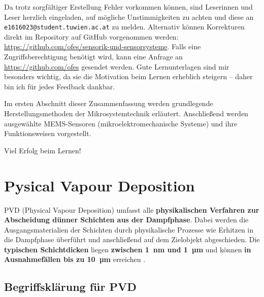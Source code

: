\documentclass{article} %
\begin{document}
Da trotz sorgfältiger Erstellung Fehler vorkommen können, sind Leserinnen und Leser herzlich eingeladen, auf mögliche Unstimmigkeiten zu achten und diese an \texttt{e1616023@student.tuwien.ac.at} zu melden. Alternativ können Korrekturen direkt im Repository auf GitHub vorgenommen werden: \url{https://github.com/ofes/sensorik-und-sensorsysteme}. Falls eine Zugriffsberechtigung benötigt wird, kann eine Anfrage an \url{https://github.com/ofes} gesendet werden. Gute Lernunterlagen sind mir besonders wichtig, da sie die Motivation beim Lernen erheblich steigern – daher bin ich für jedes Feedback dankbar.

\vspace{1em}

Im ersten Abschnitt dieser Zusammenfassung werden grundlegende Herstellungsmethoden der Mikrosystemtechnik erläutert. Anschließend werden ausgewählte MEMS-Sensoren (mikroelektromechanische Systeme) und ihre Funktionsweisen vorgestellt.

\vspace{1em}

Viel Erfolg beim Lernen!





\clearpage
\section{Pysical Vapour Deposition} %

PVD (Physical Vapour Deposition) umfasst alle \textbf{physikalischen Verfahren zur Abscheidung dünner Schichten aus der Dampfphase}. Dabei werden die Ausgangsmaterialien der Schichten durch physikalische Prozesse wie Erhitzen in die Dampfphase überführt und anschließend auf dem Zielobjekt abgeschieden. Die \textbf{typischen Schichtdicken} liegen \textbf{zwischen 1~nm und 1~µm} und können \textbf{in Ausnahmefällen bis zu 10~µm} erreichen \cite{keplinger2024}.





\vspace{1em}

\subsection{Begriffsklärung für PVD} %
\end{document}
